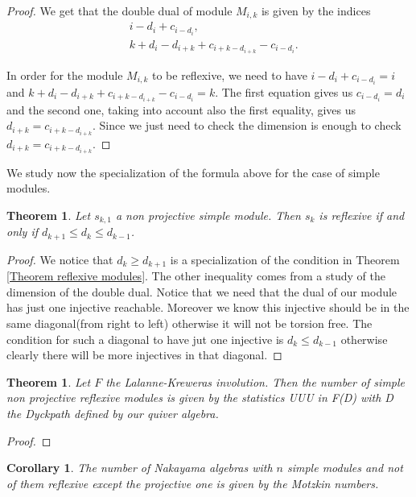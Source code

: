\documentclass[12pt, a4paper]{article}
\numberwithin{equation}{section}
\theoremstyle{definition}
\theoremstyle{plain}
\newtheorem{corollary}[definition]{Corollary}
\newtheorem{theorem}[definition]{Theorem}
\theoremstyle{remark}
\begin{document}
\begin{proof}
We get that the double dual of module $M_{i,k}$ is given by the indices
\begin{align*}
    &i - d_i + c_{i - d_i}, \\
    &k + d_i - d_{i+k} + c_{i+k-{d_{i+k}}} - c_{i-d_i}.
\end{align*}

In order for the module $M_{i,k}$ to be reflexive, we need to have $i - d_i + c_{i - d_i} = i$ and $k + d_i - d_{i+k} + c_{i+k-{d_{i+k}}} - c_{i-d_i} = k$.
The first equation gives us $c_{i - d_i} = d_i$ and the second one, taking into account also the first equality, gives us $d_{i+k} = c_{i+k-{d_{i+k}}}$.
Since we just need to check the dimension is enough to check $d_{i+k}=c_{i+k-d_{i+k}}$.
\end{proof}
We study now the specialization of the formula above for the case of simple modules.
\begin{theorem}
Let $s_{k,1}$ a non projective simple module. Then $s_k$ is reflexive
if and only if $d_{k+1}\leq d_k \leq d_{k-1}$.
\end{theorem}
\begin{proof}
	We notice that $d_k\geq d_{k+1}$ is a specialization of the condition in Theorem \ref{Theorem reflexive modules}.
	The other inequality comes from a study of the dimension of the double dual. Notice that we need that the dual of our module has just one injective reachable.
	Moreover we know this injective should be in the same diagonal(from right to left) otherwise it will not be torsion free. The condition for such a diagonal to have jut one injective is $d_{k}\leq d_{k-1}$ otherwise clearly there will be more injectives in that diagonal.
\end{proof}
\begin{theorem}
	Let $F$ the Lalanne-Kreweras involution. 
	Then the number of simple non projective reflexive modules is given by the statistics UUU in F(D) with D the Dyckpath defined by our quiver algebra.
\end{theorem}
\begin{proof}

\end{proof}
\begin{corollary}
	The number of Nakayama algebras with $n$ simple modules and not of them reflexive except the projective one is given by the Motzkin numbers.
\end{corollary}
\end{document}
